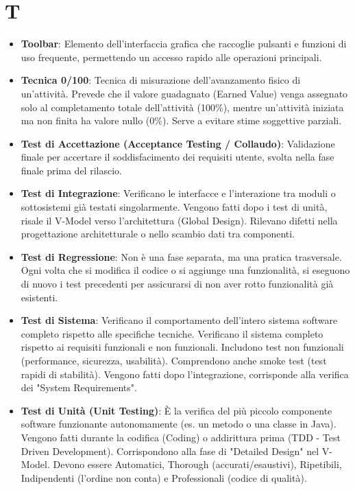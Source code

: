 \documentclass[11pt,a4paper]{article}
\begin{document}
\section*{T}
\begin{itemize}

\item \textbf{Toolbar}: Elemento dell’interfaccia grafica che raccoglie pulsanti e funzioni di uso frequente, permettendo un accesso rapido alle operazioni principali.

\item \textbf{Tecnica 0/100}: Tecnica di misurazione dell'avanzamento fisico di un'attività. Prevede che il valore guadagnato (Earned Value) venga assegnato solo al completamento totale dell'attività (100\%), mentre un'attività iniziata ma non finita ha valore nullo (0\%). Serve a evitare stime soggettive parziali.

\item \textbf{Test di Accettazione (Acceptance Testing / Collaudo)}: Validazione finale per accertare il soddisfacimento dei requisiti utente, svolta nella fase finale prima del rilascio.

\item \textbf{Test di Integrazione}: Verificano le interfacce e l'interazione tra moduli o sottosistemi già testati singolarmente. Vengono fatti dopo i test di unità, risale il V-Model verso l'architettura (Global Design). Rilevano difetti nella progettazione architetturale o nello scambio dati tra componenti.

\item \textbf{Test di Regressione}: Non è una fase separata, ma una pratica trasversale. Ogni volta che si modifica il codice o si aggiunge una funzionalità, si eseguono di nuovo i test precedenti per assicurarsi di non aver rotto funzionalità già esistenti.

\item \textbf{Test di Sistema}: Verificano il comportamento dell'intero sistema software completo rispetto alle specifiche tecniche. Verificano il sistema completo rispetto ai requisiti funzionali e non funzionali. Includono test non funzionali (performance, sicurezza, usabilità). Comprendono anche smoke test (test rapidi di stabilità). Vengono fatti dopo l'integrazione, corrisponde alla verifica dei "System Requirements".

\item \textbf{Test di Unità (Unit Testing)}: È la verifica del più piccolo componente software funzionante autonomamente (es. un metodo o una classe in Java). Vengono fatti durante la codifica (Coding) o addirittura prima (TDD - Test Driven Development). Corrispondono alla fase di "Detailed Design" nel V-Model. Devono essere Automatici, Thorough (accurati/esaustivi), Ripetibili, Indipendenti (l'ordine non conta) e Professionali (codice di qualità).

\end{itemize}
\end{document}
